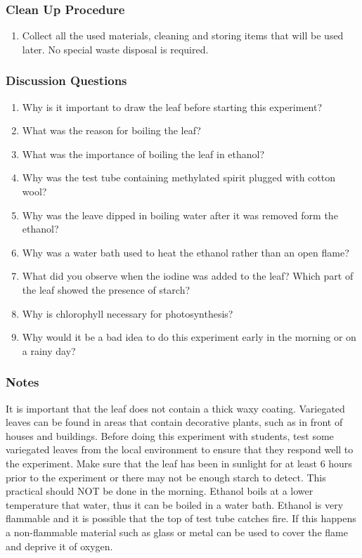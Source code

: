 \subsubsection*{Clean Up Procedure}
\begin{enumerate}
\item{Collect all the used materials, cleaning and storing items that will be used later. No special waste disposal is required.}
\end{enumerate}

\subsubsection*{Discussion Questions}
\begin{enumerate}
\item{Why is it important to draw the leaf before starting this experiment?}
\item{What was the reason for boiling the leaf?}
\item{What was the importance of boiling the leaf in ethanol?}
\item{Why was the test tube containing methylated spirit plugged with cotton wool?}
\item{Why was the leave dipped in boiling water after it was removed form the ethanol?}
\item{Why was a water bath used to heat the ethanol rather than an open flame?}
\item{What did you observe when the iodine was added to the leaf? Which part of the leaf showed the presence of starch?}
\item{Why is chlorophyll necessary for photosynthesis?}
\item{Why would it be a bad idea to do this experiment early in the morning or on a rainy day?}
\end{enumerate}

\subsubsection*{Notes}
It is important that the leaf does not contain a thick waxy coating. Variegated leaves can be found in areas that contain decorative plants, such as in front of houses and buildings. Before doing this experiment with students, test some variegated leaves from the local environment to ensure that they respond well to the experiment. Make sure that the leaf has been in sunlight for at least 6 hours prior to the experiment or there may not be enough starch to detect. This practical should NOT be done in the morning.
Ethanol boils at a lower temperature that water, thus it can be boiled in a water bath. Ethanol is very flammable and it is possible that the top of test tube catches fire. If this happens a non-flammable material such as glass or metal can be used to cover the flame and deprive it of oxygen.

